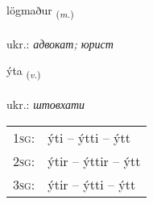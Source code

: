 \documentclass[frontgrid, backgrid]{flacards}\usepackage[]{graphicx}\usepackage[]{xcolor}
\begin{document}
\renewcommand{\flhead}{\vskip5pt \fboxsep=0pt {\small\bfseries\footnotesize Nafnorð | іменник}}
\renewcommand{\fcfoot}{\vskip5pt \fboxsep=0pt \hspace{2pt}{\small\bfseries\footnotesize 2K}}

\renewcommand{\blhead}{\vskip5pt {\small\bfseries\footnotesize Nafnorð | іменник }}
\renewcommand{\bcfoot}{\vskip5pt \hspace{2pt}{\small\bfseries\footnotesize 2K}}


{lögmaður \small{\textsubscript{(\textit{m.})}} \\[1ex] %
\textphonetic{[lœɣmaðʏr]} \\
ukr.: \emph{адвокат; юрист} \\  [2ex]
\renewcommand*{\arraystretch}{0.8}
}

\renewcommand{\flhead}{\vskip5pt \fboxsep=0pt {\small\bfseries\footnotesize Sagnorð | дієслово}}
\renewcommand{\fcfoot}{\vskip5pt \fboxsep=0pt \hspace{2pt}{\small\bfseries\footnotesize 2K}}

\renewcommand{\blhead}{\vskip5pt {\small\bfseries\footnotesize Sagnorð | дієслово }}
\renewcommand{\bcfoot}{\vskip5pt \hspace{2pt}{\small\bfseries\footnotesize 2K}}


{ýta \small{\textsubscript{(\textit{v.})}} \\[1ex] %
\textphonetic{[iːta]} \\
ukr.: \emph{штовхати} \\  [2ex]
\renewcommand*{\arraystretch}{0.8}
\begin{tabular}{p{1cm}l}
\textsc{1sg}: & ýti -- ýtti -- ýtt \\ 
\textsc{2sg}: & ýtir -- ýttir -- ýtt \\ 
\textsc{3sg}: & ýtir -- ýtti -- ýtt \\ 
\end{tabular}
}
\end{document}
